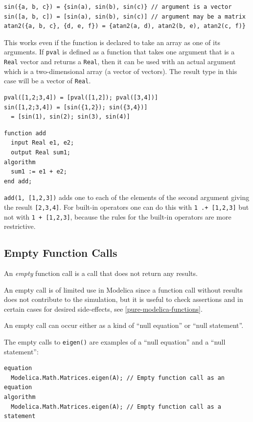 \begin{example}
\begin{lstlisting}[language=modelica]
sin({a, b, c}) = {sin(a), sin(b), sin(c)} // argument is a vector
sin([a, b, c]) = [sin(a), sin(b), sin(c)] // argument may be a matrix
atan2({a, b, c}, {d, e, f}) = {atan2(a, d), atan2(b, e), atan2(c, f)}
\end{lstlisting}
This works even if the function is declared to take an array as one of its arguments.
If \lstinline!pval! is defined as a function that takes one argument that is a \lstinline!Real! vector and returns a \lstinline!Real!, then it can be used with an actual argument which is a two-dimensional array (a vector of vectors).
The result type in this case will be a vector of \lstinline!Real!.
\begin{lstlisting}[language=modelica]
pval([1,2;3,4]) = [pval([1,2]); pval([3,4])]
sin([1,2;3,4]) = [sin({1,2}); sin({3,4})]
  = [sin(1), sin(2); sin(3), sin(4)]
\end{lstlisting}
\begin{lstlisting}[language=modelica]
function add
  input Real e1, e2;
  output Real sum1;
algorithm
  sum1 := e1 + e2;
end add;
\end{lstlisting}
\lstinline!add(1, [1,2,3])! adds one to each of the elements of the second argument giving the result \lstinline![2,3,4]!.
For built-in operators one can do this with \lstinline!1 .+ [1,2,3]! but not with \lstinline!1 + [1,2,3]!, because the rules for the built-in operators are more restrictive.
\end{example}

\subsection{Empty Function Calls}\label{empty-function-calls}

An \emph{empty} function call is a call that does not return any results.

\begin{nonnormative}
An empty call is of limited use in Modelica since a function call without results does not contribute to the simulation, but it is useful to check assertions and in certain cases for desired side-effects, see \cref{pure-modelica-functions}.
\end{nonnormative}

An empty call can occur either as a kind of ``null equation'' or ``null statement''.

\begin{example}
The empty calls to \lstinline!eigen()! are examples of a ``null equation'' and a ``null statement'':
\begin{lstlisting}[language=modelica]
equation
  Modelica.Math.Matrices.eigen(A); // Empty function call as an equation
algorithm
  Modelica.Math.Matrices.eigen(A); // Empty function call as a statement
\end{lstlisting}
\end{example}


